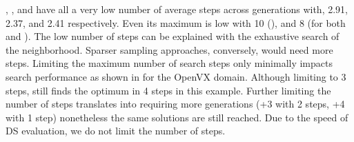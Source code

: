 
 , \gaana, \gah and \gads have all a very low number of average steps across generations with, 2.91, 2.37, and 2.41 respectively. Even its maximum is low with 10 (\gaana), and 8 (for both \gah and \gads). The low number of steps can be explained with the exhaustive search of the neighborhood. Sparser sampling approaches, conversely, would need more steps. Limiting the maximum number of search steps only minimally impacts search performance as shown in  for the OpenVX domain. Although limiting to 3 steps, \gah still finds the optimum in 4 steps in this example. Further limiting the number of steps translates into requiring more generations (+3 with 2 steps, +4 with 1 step) nonetheless the same solutions are still reached. Due to the speed of DS evaluation, we do not limit the number of steps. 


